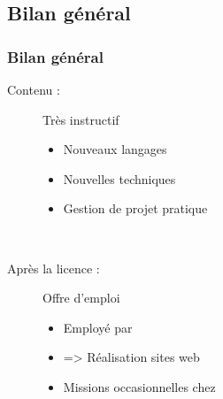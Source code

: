 \subsection{Bilan général}

\begin{frame}
	\frametitle{Bilan général}

	\begin{description}
		\item[Contenu :] Très instructif
			\begin{itemize}
				\item Nouveaux langages
				\item Nouvelles techniques\sautligne

				\item Gestion de projet \og pratique \fg
			\end{itemize}~

		\item[Après la licence :] Offre d'emploi
			\begin{itemize}
				\item Employé par \fidit
				\item => Réalisation sites web\sautligne

				\item Missions occasionnelles chez \solulog
			\end{itemize}
	\end{description}
\end{frame}
